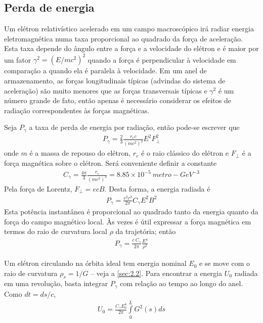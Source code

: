 \subsection{Perda de energia}\label{sec:4.1}
Um elétron relativístico acelerado em um campo macroscópico irá radiar energia eletromagnética numa taxa proporcional ao quadrado da força de aceleração. Esta taxa depende do ângulo entre a força e a velocidade do elétron e é maior por um fator $\gamma^2 = (E/mc^2)^2$ quando a força é perpendicular à velocidade em comparação a quando ela é paralela à velocidade. Em um anel de armazenamento, as forças longitudinais típicas (advindas do sistema de aceleração) são muito menores que as forças transversais típicas e $\gamma^2$ é um número grande de fato, então apenas é necessário considerar os efeitos de radiação correspondentes às forças magnéticas.

Seja $P_\gamma$ a taxa de perda de energia por radiação, então pode-se escrever que
\begin{align}
	P_\gamma = \frac{2}{3}\frac{r_e c}{(mc^2)^3} E^2 F_\perp^2
\end{align}
onde $m$ é a massa de repouso do elétron, $r_e$ é o raio clássico do elétron e $F_\perp$ é a força magnética sobre o elétron. Será conveniente definir a constante
\begin{align}
	C_\gamma = \frac{4\pi}{3}\frac{r_e}{(mc^2)^3} = 8.85 \times 10^{-5}\ metro-GeV^{-3}\label{eq:4.2}
\end{align}
Pela força de Lorentz, $F_\perp = ecB$. Desta forma, a energia radiada é
\begin{align}
	P_\gamma = \frac{e^2c^3}{2\pi}C_\gamma E^2 B^2\label{eq:4.3}
\end{align}
Esta potência instantânea é proporcional ao quadrado tanto da energia quanto da força do campo magnético local. Às vezes é útil expressar  a força magnética em termos do raio de curvatura local $\rho$ da trajetória; então
\begin{align}
	P_\gamma = \frac{c\ C_\gamma}{2\pi}\frac{E^4}{\rho^2}\label{eq:4.4}
\end{align}

Um elétron circulando na órbita ideal tem energia nominal $E_0$ e se move com o raio de curvatura $\rho_s = 1/G$ -- veja a \autoref{sec:2.2}. Para encontrar a energia $U_0$ radiada em uma revolução, basta integrar $P_\gamma$ com relação ao tempo  ao longo do anel. Como $dt = ds/c$,
\begin{align}
	U_0 = \frac{C_\gamma E_0^4}{2\pi}\int\limits_{0}^{L}G^2(s)ds\label{eq:4.5}
\end{align}

